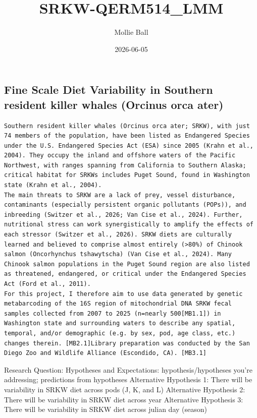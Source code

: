 \documentclass[
]{article}
\title{SRKW-QERM514\_LMM}
\author{Mollie Ball}
\date{2026-06-05}
\begin{document}
\maketitle

\subsection{Fine Scale Diet Variability in Southern resident killer
whales (Orcinus orca
ater)}\label{fine-scale-diet-variability-in-southern-resident-killer-whales-orcinus-orca-ater}

\begin{verbatim}
Southern resident killer whales (Orcinus orca ater; SRKW), with just 74 members of the population, have been listed as Endangered Species under the U.S. Endangered Species Act (ESA) since 2005 (Krahn et al., 2004). They occupy the inland and offshore waters of the Pacific Northwest, with ranges spanning from California to Southern Alaska; critical habitat for SRKWs includes Puget Sound, found in Washington state (Krahn et al., 2004).
The main threats to SRKW are a lack of prey, vessel disturbance, contaminants (especially persistent organic pollutants (POPs)), and inbreeding (Switzer et al., 2026; Van Cise et al., 2024). Further, nutritional stress can work synergistically to amplify the effects of each stressor (Switzer et al., 2026). SRKW diets are culturally learned and believed to comprise almost entirely (>80%) of Chinook salmon (Oncorhynchus tshawytscha) (Van Cise et al., 2024). Many Chinook salmon populations in the Puget Sound region are also listed as threatened, endangered, or critical under the Endangered Species Act (Ford et al., 2011). 
For this project, I therefore aim to use data generated by genetic metabarcoding of the 16S region of mitochondrial DNA SRKW fecal samples collected from 2007 to 2025 (n=nearly 500[MB1.1]) in Washington state and surrounding waters to describe any spatial, temporal, and/or demographic (e.g. by sex, pod, age class, etc.) changes therein. [MB2.1]Library preparation was conducted by the San Diego Zoo and Wildlife Alliance (Escondido, CA). [MB3.1]
\end{verbatim}

Research Question: Hypotheses and Expectations: hypothesis/hypotheses
you're addressing; predictions from hypotheses Alternative Hypothesis 1:
There will be variability in SRKW diet across pods (J, K, and L)
Alternative Hypothesis 2: There will be variability in SRKW diet across
year Alternative Hypothesis 3: There will be variability in SRKW diet
across julian day (season)
\end{document}
